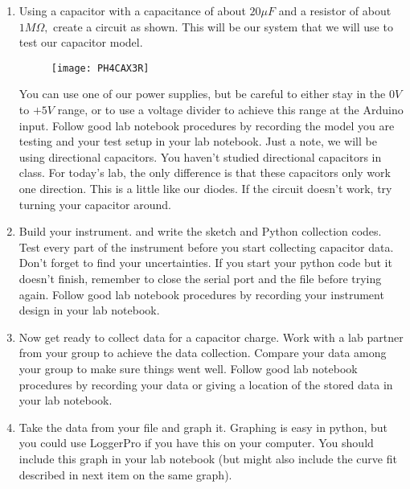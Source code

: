 \begin{enumerate}
	\item 	Using a capacitor with a capacitance of about $20\unit{\mu F}$ and a resistor of about $1\unit{M\Omega},$ create a circuit as shown. This will be our system that we will use to test our capacitor model.
	
	\begin{figure}[h!]
		\centering
		\texttt{[image: PH4CAX3R]}
	\end{figure}

	You can use one of our power supplies, but be careful to either stay in the $0\unit{V}$ to $+5\unit{V}$ range, or to use a voltage divider to achieve this range at the Arduino input. Follow good lab notebook procedures by recording the model you are testing and your test setup in your lab notebook. Just a note, we will be using directional capacitors. You haven't studied directional capacitors in class. For today's lab, the only difference is that these capacitors only work one direction. This is a little like our diodes. If the circuit doesn't work, try turning your capacitor around.

	\item Build your instrument. and write the sketch and Python collection codes. Test every part of the instrument before you start collecting capacitor data. Don't forget to find your uncertainties. If you start your python code but it doesn't finish, remember to close the serial port and the file before trying again. Follow good lab notebook procedures by recording your instrument design in your lab notebook.

	\item Now get ready to collect data for a capacitor charge. Work with a lab partner from your group to achieve the data collection. Compare your data among your group to make sure things went well. Follow good lab notebook procedures by recording your data or giving a location of the stored data in your lab notebook. 
	
	\item Take the data from your file and graph it. Graphing is easy in python, but you could use LoggerPro if you have this on your computer. You should include this graph in your lab notebook (but might also include the curve fit described in  next item on the same graph).


\end{enumerate}
